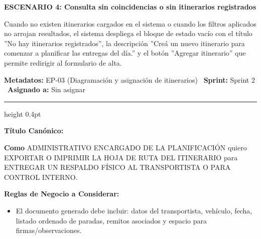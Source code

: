 \documentclass[a4paper,9pt]{article}
\begin{document}
\begin{tcolorbox}[hucard, title={\textbf{HU-60: LISTAR ITINERARIOS} \hfill \scriptsize \colorbox{tealstatus}{\textbf{\ Accepted\ }} \quad \colorbox{white}{\textcolor{primarydark}{\textbf{\ 2 pts\ }}}}]
{\noindent\textbf{\textcolor{secondarydark}{ESCENARIO 4:  Consulta sin coincidencias o sin itinerarios registrados}}\par\vspace{1pt}
Cuando no existen itinerarios cargados en el sistema o cuando los filtros aplicados no arrojan resultados, el sistema despliega el bloque de estado vacío con el título ''No hay itinerarios registrados'', la descripción ''Creá un nuevo itinerario para comenzar a planificar las entregas del día.'' y el botón ''Agregar itinerario'' que permite redirigir al formulario de alta.\par\vspace{2.5pt}
}\par
\end{tcolorbox}

\begin{tcolorbox}[hucard, title={\textbf{HU-61: EXPORTAR HOJA DE RUTA / ITINERARIO} \hfill \scriptsize \colorbox{redstatus}{\textbf{\ Rejected\ }} \quad \colorbox{white}{\textcolor{primarydark}{\textbf{\ 3 pts\ }}}}]
\vspace{-1pt}
\noindent\textbf{\footnotesize Metadatos:} EP-03 (Diagramación y asignación de itinerarios) \textbar\ \textbf{Sprint:} Sprint 2 \textbar\ \textbf{Asignado a:} Sin asignar\par\vspace{2pt}
\hrule height 0.4pt\par\vspace{3pt}
\noindent\textbf{\footnotesize Título Canónico:}\par\vspace{1pt}
{\small \textbf{Como} ADMINISTRATIVO ENCARGADO DE LA PLANIFICACIÓN quiero EXPORTAR O IMPRIMIR LA HOJA DE RUTA DEL ITINERARIO para ENTREGAR UN RESPALDO FÍSICO AL TRANSPORTISTA O PARA CONTROL INTERNO.}\par\vspace{3pt}
\noindent\textbf{\footnotesize Reglas de Negocio a Considerar:}\par\vspace{1pt}
{\footnotesize
\begin{itemize}[leftmargin=12pt, nosep, itemsep=1.5pt, topsep=1pt]
\item El documento generado debe incluir: datos del transportista, vehículo, fecha, listado ordenado de paradas, remitos asociados y espacio para firmas/observaciones.
\end{itemize}
}\par\vspace{3pt}

\end{tcolorbox}
\end{document}

